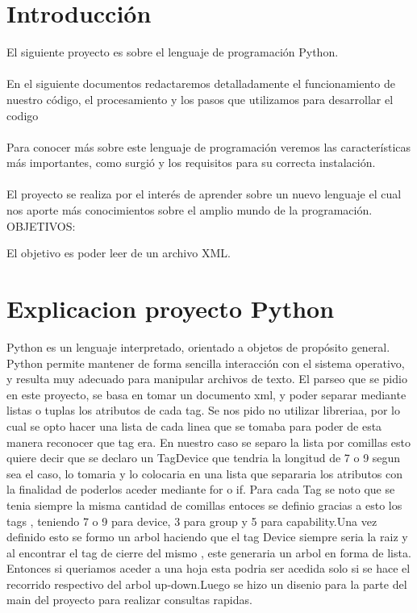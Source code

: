 \documentclass[11pt]{article} %
\begin{document}
\section{Introducción}
El siguiente proyecto es sobre el lenguaje de programación Python.\\ 
\\En el siguiente documentos redactaremos detalladamente el funcionamiento de nuestro código, el procesamiento y los pasos que utilizamos para desarrollar el codigo \\
\\Para conocer más sobre este lenguaje de programación veremos las características más importantes,  como surgió y los requisitos para su correcta instalación. \\
\\El proyecto se realiza por el interés de aprender sobre un nuevo lenguaje el cual nos aporte más conocimientos sobre el amplio mundo de la programación.\\






OBJETIVOS:

El objetivo es poder leer de un archivo XML.

\section{Explicacion proyecto Python}
Python es un lenguaje interpretado, orientado a objetos de propósito general. Python permite mantener de forma sencilla interacción con el sistema operativo, y resulta muy adecuado para manipular archivos de texto. 
El parseo que se pidio en este proyecto, se basa en tomar un documento xml, y poder separar mediante listas o tuplas los atributos de cada tag. Se nos pido no utilizar libreriaa, por lo cual se opto hacer una lista de cada linea que se tomaba para poder de esta manera reconocer que tag era. En nuestro caso se separo la lista por comillas esto quiere decir que se declaro un TagDevice que tendria la longitud de 7 o 9 segun sea el caso, lo tomaria y lo colocaria en una lista que separaria los atributos con la finalidad de poderlos aceder mediante for o if. Para cada Tag se noto que se tenia siempre la misma cantidad de comillas entoces se definio gracias a esto los tags , teniendo 7 o 9 para device, 3 para group y 5 para capability.Una vez definido esto se formo un arbol haciendo que el tag Device siempre seria la raiz y al encontrar el tag de cierre del mismo , este generaria un arbol en forma de lista. Entonces si queriamos aceder a una hoja esta podria ser acedida solo si se hace el recorrido respectivo del arbol up-down.Luego se hizo un disenio para la parte del main del proyecto para realizar consultas rapidas. 
\end{document}

